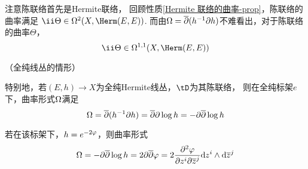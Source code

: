 
\begin{rem}注意陈联络首先是Hermite联络，
回顾性质\ref{Hermite 联络的曲率-prop}，陈联络的曲率满足
$\ii\Theta\in\Omg^{2}(X,\Herm(E,E))$.
而由$\Omega=\overline{\partial}(h^{-1}\partial h)$不难看出，对于陈联络的曲率$\Theta$，
$$\ii\Theta\in\Omg^{1,1}(X,\Herm(E,E))$$
\end{rem}


\begin{example}（全纯线丛的情形）

特别地，若$(E,h)\to X$为全纯Hermite线丛，$\tD$为其陈联络，
则在全纯标架$e$下，曲率形式$\Omega$满足
$$\Omega=\overline{\partial}(h^{-1}\partial h)=\overline{\partial}\partial\log h=-\partial\overline{\partial}\log h$$
\end{example}
若在该标架下，$h=e^{-2\varphi}$，则曲率形式
$$
  \Omega=-\partial\overline{\partial}\log h=2\partial\overline{\partial}\varphi
= 2\frac{\partial^2{\varphi}} {\partial{z^i}\partial{\overline{z}^j}}\mathrm{d} z^i\wedge\mathrm{d}\overline{z}^j
$$


